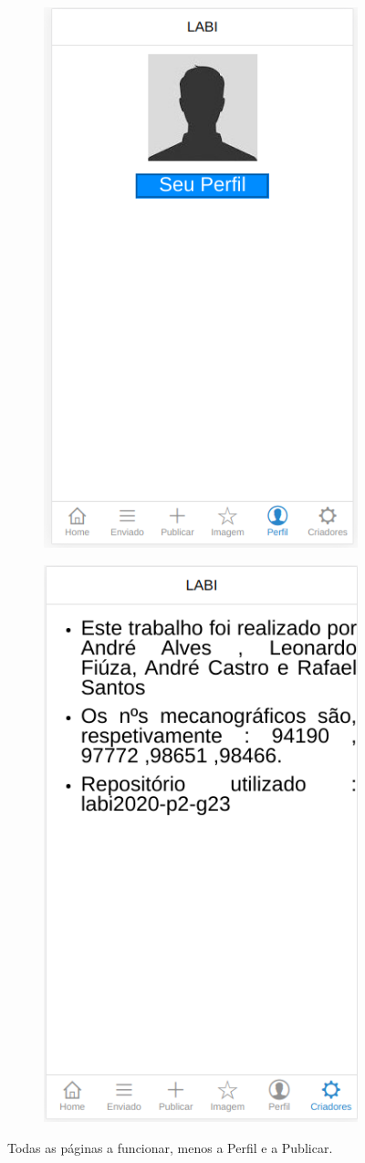 \documentclass{report}
\begin{document}
\begin{figure}[hbt!]
\begin{subfigure}{.5\textwidth}
  \caption{}
\end{subfigure}
\begin{subfigure}{.5\textwidth}
  \centering
  \includegraphics[width=0.6\linewidth]{perfil.png}
  \caption{}
\end{subfigure}%
\begin{subfigure}{.5\textwidth}
  \centering
  \includegraphics[width=0.6\linewidth]{criadores.png}
  \caption{}
\end{subfigure}%
	\caption{Todas as páginas a funcionar, menos a Perfil e a Publicar.}
\end{figure}
\end{document}
